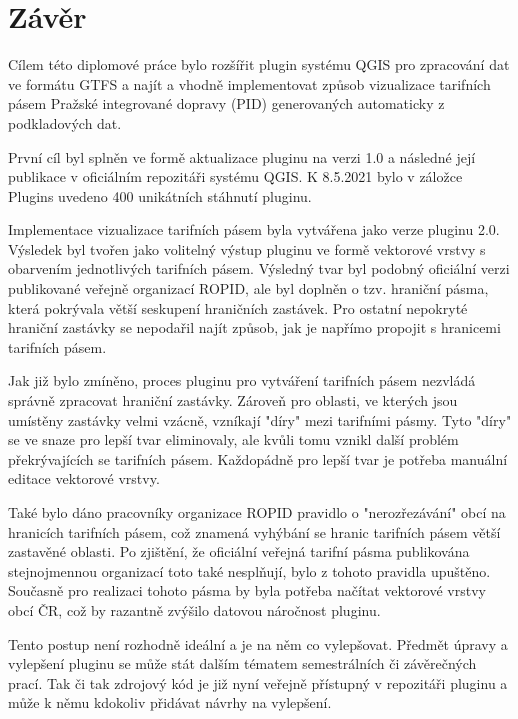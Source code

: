 \chapter*{Závěr}
\label{6-zaver}

Cílem této diplomové práce bylo rozšířit plugin systému QGIS pro zpracování dat 
ve formátu GTFS a najít a vhodně implementovat způsob vizualizace tarifních pásem Pražské integrované dopravy 
(PID) generovaných automaticky z podkladových dat.

První cíl byl splněn ve formě aktualizace pluginu na verzi 1.0 a následné její publikace v oficiálním
repozitáři systému QGIS. K 8.5.2021 bylo v záložce Plugins uvedeno 400 unikátních stáhnutí pluginu.

Implementace vizualizace tarifních pásem byla vytvářena jako verze pluginu 2.0. Výsledek
byl tvořen jako volitelný výstup pluginu ve formě vektorové vrstvy s obarvením jednotlivých tarifních pásem.
Výsledný tvar byl podobný oficiální verzi publikované veřejně organizací ROPID, ale byl doplněn o tzv. hraniční pásma,
která pokrývala větší seskupení hraničních zastávek. Pro ostatní nepokryté hraniční zastávky 
se nepodařil najít způsob, jak je napřímo propojit s hranicemi tarifních pásem.

Jak již bylo zmíněno, proces pluginu pro vytváření tarifních pásem nezvládá správně zpracovat hraniční zastávky.
Zároveň pro oblasti, ve kterých jsou umístěny zastávky velmi vzácně, vzníkají "díry" mezi tarifními pásmy.
Tyto "díry" se ve snaze pro lepší tvar eliminovaly, ale kvůli tomu vznikl další problém překrývajících se tarifních pásem.
Každopádně pro lepší tvar je potřeba manuální editace vektorové vrstvy.

Také bylo dáno pracovníky organizace ROPID pravidlo o "nerozřezávání" obcí na hranicích tarifních pásem,
což znamená vyhýbání se hranic tarifních pásem větší zastavěné oblasti.
Po zjištění, že oficiální veřejná tarifní pásma publikována stejnojmennou organizací toto také nesplňují,
bylo z tohoto pravidla upuštěno. Současně pro realizaci tohoto pásma by byla potřeba načítat vektorové vrstvy
obcí ČR, což by razantně zvýšilo datovou náročnost pluginu.

Tento postup není rozhodně ideální a je na něm co vylepšovat. Předmět úpravy a vylepšení pluginu
se může stát dalším tématem semestrálních či závěrečných prací. Tak či tak zdrojový kód
je již nyní veřejně přístupný v repozitáři pluginu a může k němu kdokoliv přidávat
návrhy na vylepšení.  

